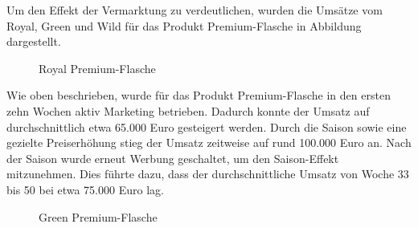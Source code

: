 \documentclass[a4paper,12pt]{article}
\begin{document}
Um den Effekt der Vermarktung zu verdeutlichen, wurden die Umsätze vom Royal, 
Green und Wild für das Produkt Premium-Flasche in Abbildung dargestellt.
\begin{figure}[H]
    \centering
    \caption{Royal Premium-Flasche}
    \label{fig:Royal Premium-Flasche}
\end{figure}
Wie oben beschrieben, wurde für das Produkt Premium-Flasche in den ersten zehn Wochen aktiv Marketing betrieben. 
Dadurch konnte der Umsatz auf durchschnittlich etwa 65.000 Euro gesteigert werden.
Durch die Saison sowie eine gezielte Preiserhöhung stieg der Umsatz zeitweise auf rund 100.000 Euro an.
Nach der Saison wurde erneut Werbung geschaltet, um den Saison-Effekt mitzunehmen.
Dies führte dazu, dass der durchschnittliche Umsatz von Woche 33 bis 50 bei etwa 75.000 Euro lag.
\begin{figure}[H]
    \centering
    \caption{Green Premium-Flasche}
    \label{fig:Green Premium-Flasche}
\end{figure}
\end{document}
